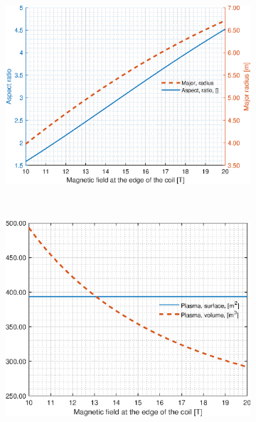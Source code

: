 \begin{figure}[H]
	\begin{subfigure}[h!]{.45\textwidth}
		\includegraphics[width=\textwidth]{MatlabFigures/Bmax/f3.eps}
	\end{subfigure}
	~
	\begin{subfigure}[h!]{.45\textwidth}
		\includegraphics[width=\textwidth]{MatlabFigures/Bmax/f4.eps}
	\end{subfigure}


\end{figure}
